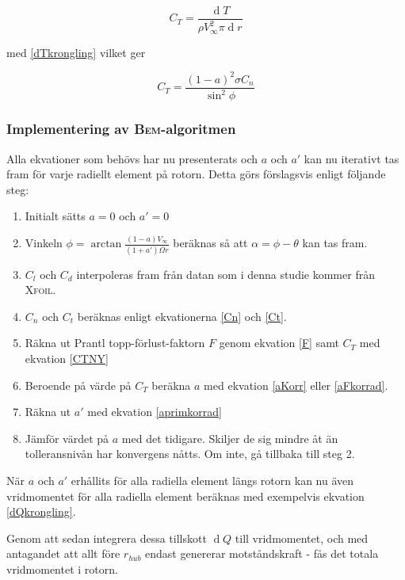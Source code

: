 \begin{equation}
C_T = \frac{\operatorname{d}\!T}{ \rho V^2_{\infty} \pi \operatorname{d}\!r}
\end{equation}

med \ref{dTkrongling} vilket ger

\begin{equation}
\label{CTNY}C_T = \frac{(1 - a)^2\sigma C_n}{\sin^2 \phi}
\end{equation}


\pagebreak
\subsubsection{Implementering av \textsc{Bem}-algoritmen}

Alla ekvationer som behövs har nu presenterats och $a$ och $a'$ kan nu iterativt tas fram för varje radiellt element på rotorn. Detta görs förslagsvis enligt följande steg:

\begin{enumerate}
  \item Initialt sätts $a = 0$ och $a' = 0$
  \item Vinkeln $\phi = \arctan \frac{(1 - a)V_{\infty}}{(1 + a')\Omega r}$ beräknas så att $\alpha = \phi - \theta$ kan tas fram.
  \item $C_l$ och $C_d$ interpoleras fram från datan som i denna studie kommer från \textsc{Xfoil}. 
  \item $C_n$ och $C_t$ beräknas enligt ekvationerna \ref{Cn} och \ref{Ct}.
  \item Räkna ut Prantl topp-förlust-faktorn $F$ genom ekvation \ref{F} samt $C_T$ med ekvation \ref{CTNY}
  \item Beroende på värde på $C_T$ beräkna $a$ med ekvation \ref{aKorr} eller \ref{aFkorrad}.
  \item Räkna ut $a'$ med ekvation \ref{aprimkorrad}
  \item Jämför värdet på $a$ med det tidigare. Skiljer de sig mindre åt än tolleransnivån har konvergens nåtts. Om inte, gå tillbaka till steg 2.
  \end{enumerate}
  
När $a$ och $a'$ erhållits för alla radiella element längs rotorn kan nu även vridmomentet för alla radiella element beräknas med exempelvis ekvation \ref{dQkrongling}.

Genom att sedan integrera dessa tillskott $\operatorname{d}\!Q$ till vridmomentet, och med antagandet att allt före $r_{hub}$ endast genererar motståndskraft - fås det totala vridmomentet i rotorn. 

